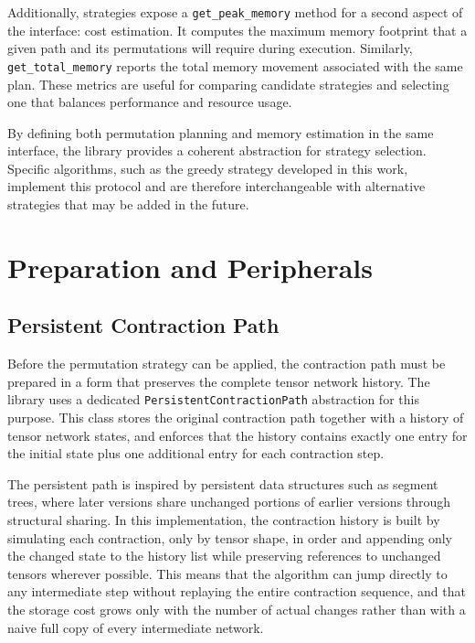 Additionally, strategies expose a \texttt{get\_peak\_memory} method for a second aspect of the interface: cost estimation. It computes the maximum memory footprint that a given path and its permutations will require during execution. Similarly, \texttt{get\_total\_memory} reports the total memory movement associated with the same plan. These metrics are useful for comparing candidate strategies and selecting one that balances performance and resource usage.

By defining both permutation planning and memory estimation in the same interface, the library provides a coherent abstraction for strategy selection. Specific algorithms, such as the greedy strategy developed in this work, implement this protocol and are therefore interchangeable with alternative strategies that may be added in the future.

\section{Preparation and Peripherals}

\subsection{Persistent Contraction Path}

Before the permutation strategy can be applied, the contraction path must be prepared in a form that preserves the complete tensor network history. The library uses a dedicated \texttt{PersistentContractionPath} abstraction for this purpose. This class stores the original contraction path together with a history of tensor network states, and enforces that the history contains exactly one entry for the initial state plus one additional entry for each contraction step.

The persistent path is inspired by persistent data structures such as segment trees, where later versions share unchanged portions of earlier versions through structural sharing. In this implementation, the contraction history is built by simulating each contraction, only by tensor shape, in order and appending only the changed state to the history list while preserving references to unchanged tensors wherever possible. This means that the algorithm can jump directly to any intermediate step without replaying the entire contraction sequence, and that the storage cost grows only with the number of actual changes rather than with a naive full copy of every intermediate network.

